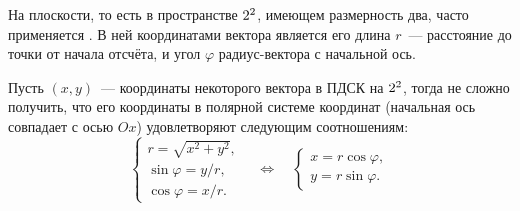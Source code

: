 \begin{wrapfigure}{r}{0.27\tw}
    \centering
    \vspace{-1pc}
    \caption{}
    \label{pic:math-coord-sys-polar}
\end{wrapfigure}
На плоскости, то есть в пространстве $2^2$, имеющем размерность два, часто применяется . В ней координатами вектора является его длина $r$~--- расстояние до точки от начала отсчёта, и угол $\varphi$ радиус-вектора с начальной ось.

Пусть $(x,y)$~--- координаты некоторого вектора в ПДСК на $2^2$, тогда не сложно получить, что его координаты в полярной системе координат (начальная ось совпадает с осью $Ox$)  удовлетворяют следующим соотношениям:
\begin{equation}
    \begin{cases}
        r = \sqrt{x^2 + y^2},\\
        \sin \varphi = y/r,\\
        \cos \varphi = x/r.
    \end{cases}
    \quad \Leftrightarrow \quad
    \begin{cases}
        x = r \cos \varphi,\\
        y = r \sin \varphi.
    \end{cases}
\end{equation}

